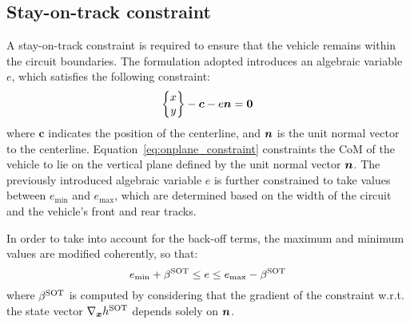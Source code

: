 \subsection{Stay-on-track constraint}
\label{sec:stayontrack_constraint}
A stay-on-track constraint is required to ensure that the vehicle remains within the circuit boundaries. The formulation adopted introduces an algebraic variable $e$, which satisfies the following constraint:
\begin{equation}
	\begin{Bmatrix}
		x\\y
	\end{Bmatrix}
	-\boldsymbol{c} - e\bn=\boldsymbol{0} \label{eq:onplane_constraint}
\end{equation}
where $\boldsymbol{c}$ indicates the position of the centerline, and $\boldsymbol{n}$ is the unit normal vector to the centerline. Equation~\eqref{eq:onplane_constraint} constraints the CoM of the vehicle to lie on the vertical plane defined by the unit normal vector $\boldsymbol{n}$. The previously introduced algebraic variable $e$ is further constrained to take values between $e_\textrm{min}$ and $e_\textrm{max}$, which are determined based on the width of the circuit and the vehicle's front and rear tracks. 

In order to take into account for the back-off terms, the maximum and minimum values are modified coherently, so that:
\begin{equation}
	e_\textrm{min} + \be^\textrm{SOT} \leq e \leq e_\textrm{max} - \be^\textrm{SOT}\label{eq:stayontrack_constraint}
\end{equation}
where $\beta^\textrm{SOT}$ is computed by considering that the gradient of the constraint w.r.t. the state vector $\nabla_{\boldsymbol{x}}h^\textrm{SOT}$ depends solely on $\boldsymbol{n}$.
